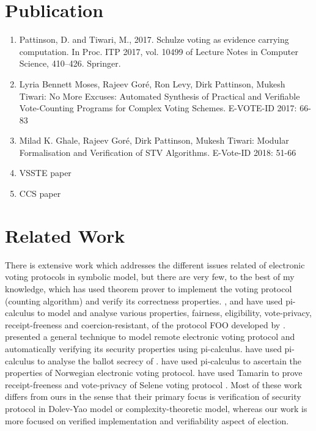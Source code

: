 \section{Publication}
	\begin{enumerate}
	\item Pattinson, D. and Tiwari, M., 2017. Schulze voting as evidence carrying computation. In Proc. 
	ITP 2017, vol. 10499 of Lecture Notes in Computer Science, 410–426. Springer. 
	\item Lyria Bennett Moses, Rajeev Goré, Ron Levy, Dirk Pattinson, Mukesh Tiwari:
	No More Excuses: Automated Synthesis of Practical and Verifiable Vote-Counting Programs for Complex 
	Voting 	Schemes. E-VOTE-ID 2017: 66-83
	\item Milad K. Ghale, Rajeev Goré, Dirk Pattinson, Mukesh Tiwari:
	Modular Formalisation and Verification of STV Algorithms. E-Vote-ID 2018: 51-66
	\item VSSTE paper
	\item CCS paper

	\end{enumerate}




\section{Related Work}
 There is extensive work which 
 addresses the different issues related of electronic voting protocols  in symbolic model, 
 but there are very few, to the best of my knowledge, 
 which has used theorem prover to implement the voting protocol (counting algorithm)
 and verify its correctness properties. 
 \cite{10.1007/978-3-540-31987-0_14}, and  \cite{Delaune2010} have used pi-calculus to model 
 and analyse various properties, fairness, eligibility, vote-privacy, receipt-freeness and coercion-resistant,  
 of the protocol FOO developed by \cite{10.1007/3-540-57220-1_66}.  \cite{Backes:2008:AVR:1380848.1381255}
 presented a general technique to model  remote electronic 
 voting protocol and automatically verifying  its security properties using pi-calculus. 
 \cite{5992139} have used pi-calculus to analyse the ballot secrecy of \cite{Helios:2016:HVS}.
 \cite{10.1007/978-3-642-28641-4_7} have used pi-calculus to ascertain the properties of 
 Norwegian electronic voting protocol.
 \cite{10.1007/978-3-319-68687-5_7} have used Tamarin  to prove receipt-freeness 
 and vote-privacy of Selene voting protocol \citep{Selene}.  Most of these work differs from ours
 in the sense that their primary focus is verification of security protocol in  
 Dolev-Yao model or  complexity-theoretic model, whereas our work is 
 more focused on verified implementation and  verifiability  aspect of election.

